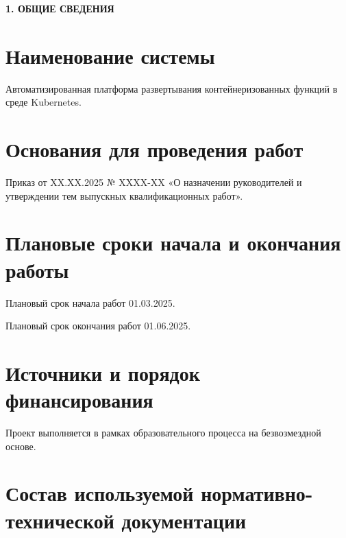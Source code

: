 \onehalfspacing
\setcounter{page}{2}

\newpage
\renewcommand{\contentsname}{\centerline{\large СОДЕРЖАНИЕ}}
\tableofcontents

\newpage
\begin{center}
  \textbf{\large 1. ОБЩИЕ СВЕДЕНИЯ}
\end{center}

\section{Наименование системы}

Автоматизированная платформа развертывания контейнеризованных \break функций в среде Kubernetes.

\section{Основания для проведения работ}

Приказ от XX.XX.2025 № XXXX-XX «О назначении руководителей и
утверждении тем выпускных квалификационных работ».

\section{Плановые сроки начала и окончания работы}

Плановый срок начала работ 01.03.2025.

Плановый срок окончания работ 01.06.2025.

\section{Источники и порядок финансирования}

Проект выполняется в рамках образовательного процесса на безвозмездной основе.

\section{Состав используемой нормативно-технической документации}

